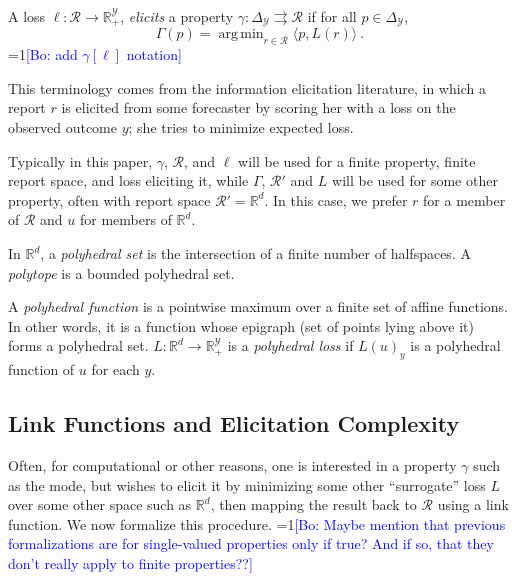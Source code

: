\documentclass[anon,12pt]{colt2019}
\newcommand{\Comments}{1}
\newcommand{\mynote}[2]{\ifnum\Comments=1\textcolor{#1}{#2}\fi}
\newcommand{\bo}[1]{\mynote{blue}{[Bo: #1]}}
\newcommand{\reals}{\mathbb{R}}
\newcommand{\simplex}{\Delta_\Y}
\newcommand{\R}{\mathcal{R}}
\newcommand{\Y}{\mathcal{Y}}
\newcommand{\inprod}[2]{\langle #1, #2 \rangle}%
\newcommand{\toto}{\rightrightarrows}
\DeclareMathOperator*{\argmin}{arg\,min}
\begin{document}
\begin{definition}[Elicits]
  A loss $\ell:\R\to\reals^\Y_+$, \emph{elicits} a property $\gamma:\simplex \toto \R$ if for all $p \in \simplex$,
  \begin{equation}
  \Gamma(p) = \argmin_{r \in \R} \inprod{p}{L(r)}~.
  \end{equation}
  \bo{add $\gamma[\ell]$ notation}
\end{definition}
This terminology comes from the information elicitation literature, in which a report $r$ is elicited from some forecaster by scoring her with a loss on the observed outcome $y$; she tries to minimize expected loss.

Typically in this paper, $\gamma$, $\R$, and $\ell$ will be used for a finite property, finite report space, and loss eliciting it, while $\Gamma$, $\R'$ and $L$ will be used for some other property, often with report space $\R' = \reals^d$.
In this case, we prefer $r$ for a member of $\R$ and $u$ for members of $\reals^d$.

In $\reals^d$, a \emph{polyhedral set} is the intersection of a finite number of halfspaces.
A \emph{polytope} is a bounded polyhedral set.
\begin{definition}
  A \emph{polyhedral function} is a pointwise maximum over a finite set of affine functions.
  In other words, it is a function whose epigraph (set of points lying above it) forms a polyhedral set.
  $L: \reals^d \to \reals^{\Y}_+$ is a \emph{polyhedral loss} if $L(u)_y$ is a polyhedral function of $u$ for each $y$.
\end{definition}


\subsection{Link Functions and Elicitation Complexity}\label{sec:link-elic}
Often, for computational or other reasons, one is interested in a property $\gamma$ such as the mode, but wishes to elicit it by minimizing some other ``surrogate'' loss $L$ over some other space such as $\reals^d$, then mapping the result back to $\R$ using a link function.
We now formalize this procedure.
\bo{Maybe mention that previous formalizations are for single-valued properties only if true? And if so, that they don't really apply to finite properties??}
\end{document}
